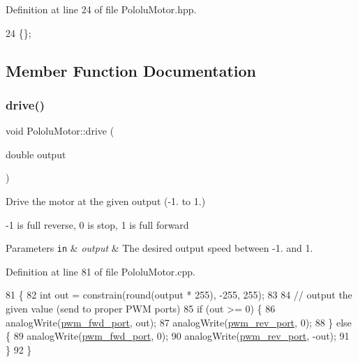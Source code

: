 Definition at line 24 of file Pololu\+Motor.\+hpp.


\begin{DoxyCode}
24 \{\};
\end{DoxyCode}


\subsection{Member Function Documentation}
\mbox{\label{class_pololu_motor_abcece838332aaf501b6ae63fa371422e}} 
\subsubsection{\texorpdfstring{drive()}{drive()}}
{\footnotesize\ttfamily void Pololu\+Motor\+::drive (\begin{DoxyParamCaption}\item[{double}]{output }\end{DoxyParamCaption})}



Drive the motor at the given output (-\/1. to 1.) 

-\/1 is full reverse, 0 is stop, 1 is full forward 
\begin{DoxyParams}[1]{Parameters}
\mbox{\tt in}  & {\em output} & The desired output speed between -\/1. and 1. \\
\hline
\end{DoxyParams}


Definition at line 81 of file Pololu\+Motor.\+cpp.


\begin{DoxyCode}
81                                      \{
82     \textcolor{keywordtype}{int} out = constrain(round(output * 255), -255, 255);
83 
84     \textcolor{comment}{// output the given value (send to proper PWM ports)}
85     \textcolor{keywordflow}{if} (out >= 0) \{
86         analogWrite(\hyperlink{class_pololu_motor_a0685d77c55b5ff024ca26b959e26285f}{pwm\_fwd\_port}, out);
87         analogWrite(\hyperlink{class_pololu_motor_a6ad3e14d6c3e1c8806bce32f794d5ec9}{pwm\_rev\_port}, 0);
88     \} \textcolor{keywordflow}{else} \{
89         analogWrite(\hyperlink{class_pololu_motor_a0685d77c55b5ff024ca26b959e26285f}{pwm\_fwd\_port}, 0);
90         analogWrite(\hyperlink{class_pololu_motor_a6ad3e14d6c3e1c8806bce32f794d5ec9}{pwm\_rev\_port}, -out);
91     \}
92 \}
\end{DoxyCode}
\mbox{\label{class_pololu_motor_aa839e55cf769cbdec066e82f148fbd1d}} 
